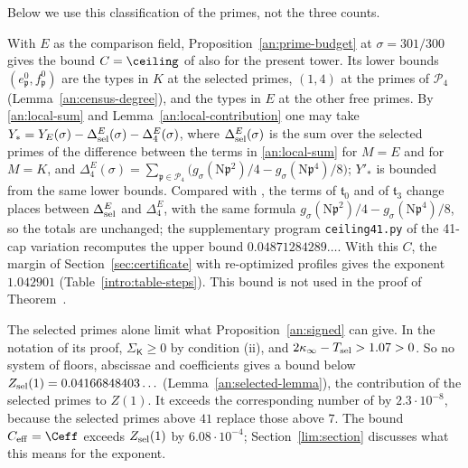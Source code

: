 Below we use this classification of the primes, not the three counts.


\begin{remark}\label{an:base-ceiling}
With $E$ as the comparison field, Proposition~\ref{an:prime-budget} at
$\sigma=301/300$ gives the bound $C=\ceiling$ of
\cite[Section~4]{Naslund04273} also for the present tower. Its lower bounds
$(e^0_{\mathfrak p},f^0_{\mathfrak p})$ are the types in $K$ at the selected
primes, $(1,4)$ at the primes of $\mathcal P_4$
(Lemma~\ref{an:census-degree}), and the types in $E$ at the other free
primes. By \eqref{an:local-sum} and Lemma~\ref{an:local-contribution} one may
take $Y_*=Y_E(\sigma)-\Delta^E_{\rm sel}(\sigma)-\Delta^E_4(\sigma)$, where
$\Delta^E_{\rm sel}(\sigma)$ is the sum over the selected primes of the
difference between the terms in \eqref{an:local-sum} for $M=E$ and for
$M=K$, and
$\Delta^E_4(\sigma)=\sum_{\mathfrak p\in\mathcal P_4}\bigl(g_\sigma(\mathrm
N\mathfrak p^2)/4-g_\sigma(\mathrm N\mathfrak p^4)/8\bigr)$; $Y'_*$ is bounded
from the same lower bounds. Compared with \cite{Naslund04273}, the terms
of $\mathfrak t_0$ and of $\mathfrak t_3$ change places between $\Delta^E_{\rm sel}$ and
$\Delta^E_4$, with the same formula
$g_\sigma(\mathrm N\mathfrak p^2)/4-g_\sigma(\mathrm N\mathfrak p^4)/8$, so the
totals are unchanged; the supplementary program \texttt{ceiling41.py} of the
41-cap variation recomputes the upper bound $0.04871284289\ldots$. With this
$C$, the margin of Section~\ref{sec:certificate} with re-optimized profiles
gives the exponent $1.042901$ (Table~\ref{intro:table-steps}). This bound is
not used in the proof of Theorem~.
\end{remark}

\begin{remark}\label{an:limit-remark}
The selected primes alone limit what Proposition~\ref{an:signed} can give.
In the notation of its proof, $\Sigma_{\mathsf K}\ge0$ by condition (ii), and
$2\kappa_\infty-T_{\rm sel}>1.07>0$. So no system of floors, abscissae and
coefficients gives a bound below
$Z_{\rm sel}(1)=0.04166848403\ldots$ (Lemma~\ref{an:selected-lemma}), the
contribution of the selected primes to $Z(1)$. It exceeds the corresponding
number of \cite{Naslund04273} by $2.3\cdot10^{-8}$, because the selected
primes above $41$ replace those above $7$. The bound $C_{\rm eff}=\Ceff$
exceeds $Z_{\rm sel}(1)$ by $6.08\cdot10^{-4}$; Section~\ref{lim:section}
discusses what this means for the exponent.
\end{remark}


